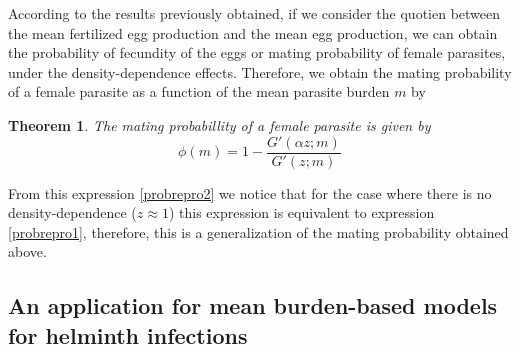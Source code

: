 \documentclass[12pt,a4paper]{article}
\theoremstyle{plain}%
\newtheorem{thm}{Theorem}[subsection]
\theoremstyle{definition}
\theoremstyle{remark}
\begin{document}
According to the results previously obtained, if we consider the quotien between the mean fertilized egg production and the mean egg production, we can obtain 
the probability of fecundity of the eggs or mating probability of female parasites, under the density-dependence effects.
Therefore, we obtain the mating probability of a female parasite as a function of the mean parasite burden $m$ by
	\begin{thm} The mating probabillity of a female parasite is given by
	\begin{equation}\label{probrepro2}
	\phi(m)=1-\frac{G'(\alpha z;m)}{G'(z;m)} 
	\end{equation}
	\end{thm}
	From this expression \eqref{probrepro2} we notice that for the case where there is no density-dependence ($z \approx 1$) this expression is equivalent to expression \eqref{probrepro1}, %
	therefore, this is a generalization of the mating probability obtained above.
	
	\subsection{An application for mean burden-based models for helminth infections}
	
\end{document}
